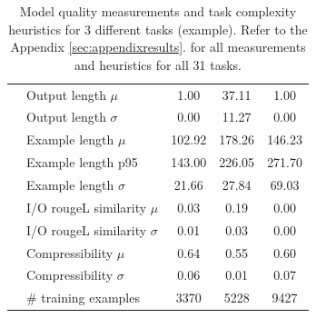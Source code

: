 \begin{table}[ht]
{\begin{tabular}{clccc}
                                                & Output length $\mu$          & 1.00                                       & 37.11                               & 1.00                               \\
                                                & Output length $\sigma$          & 0.00                                       & 11.27                               & 0.00                               \\
                                                & Example length $\mu$         & 102.92                                     & 178.26                              & 146.23                             \\
                                                & Example length p95       & 143.00                                     & 226.05                              & 271.70                             \\
                                                & Example length $\sigma$         & 21.66                                      & 27.84                               & 69.03                              \\
                                                & I/O rougeL similarity $\mu$  & 0.03                                       & 0.19                                & 0.00                               \\
                                                & I/O rougeL similarity $\sigma$  & 0.01                                       & 0.03                                & 0.00                               \\
                                                & Compressibility $\mu$        & 0.64                                       & 0.55                                & 0.60                               \\
                                                & Compressibility $\sigma$        & 0.06                                       & 0.01                                & 0.07                               \\
                                                & \# training examples     & 3370                                       & 5228                                & 9427                              
\end{tabular}
}
\caption{Model quality measurements and task complexity heuristics for 3 different tasks (example). Refer to the Appendix \protect\ref{sec:appendixresults}.
\label{table:datasetcomplexityheuristics} for all measurements and heuristics for all 31 tasks.}

\end{table}

